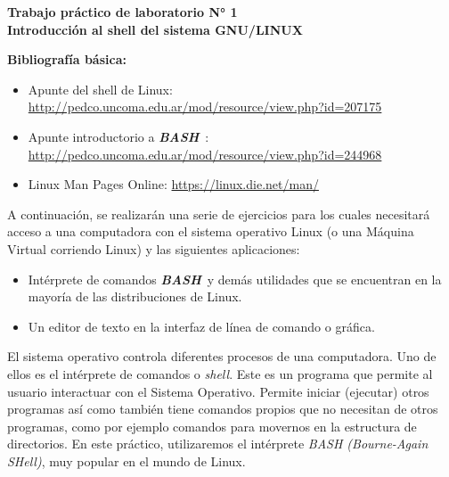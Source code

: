 \documentclass[12pt]{article}
\def\maketitle{

\makeatletter
{\color{bl} \centering \huge \sc \textbf{ Trabajo práctico de laboratorio N° 1\\ \large
\vspace*{-8pt} \color{black} Introducción al shell del sistema GNU/LINUX \vspace*{8pt} }\par}
\makeatother

\makeatletter


}
\newcommand{\bash}{\textbf{\emph{BASH}}\ }
\begin{document}
\thispagestyle{empty}
\maketitle
\setlength{\parindent}{1pt}

\textbf{Bibliografía básica:}
\vspace{-2\topsep}
\begin{itemize}

    \itemsep2pt \parskip0pt 

    \item Apunte del shell de Linux:
        \url{http://pedco.uncoma.edu.ar/mod/resource/view.php?id=207175}

    \item Apunte introductorio a \bash:
        \url{http://pedco.uncoma.edu.ar/mod/resource/view.php?id=244968}

    \item Linux Man Pages Online: \url{https://linux.die.net/man/}

\end{itemize}

A continuación, se realizarán una serie de ejercicios para los cuales
necesitará acceso a una computadora con el sistema operativo Linux (o una
Máquina Virtual corriendo Linux) y las siguientes aplicaciones:

\vspace{-2\topsep}
\begin{itemize}
    
    \itemsep2pt \parskip0pt 
        
    \item   Intérprete de comandos \bash y demás utilidades que se encuentran
        en la mayoría de las distribuciones de Linux.
        
    \item   Un editor de texto en la interfaz de línea de comando o gráfica.

\end{itemize}

El sistema operativo controla diferentes procesos de una computadora. Uno de
ellos es el intérprete de comandos o \emph{shell}. Este es un programa que
permite al usuario interactuar con el Sistema Operativo. Permite iniciar
(ejecutar) otros programas así como también tiene comandos propios que no
necesitan de otros programas, como por ejemplo comandos para movernos en la
estructura de directorios. En este práctico, utilizaremos el intérprete
\emph{BASH (Bourne-Again SHell)}, muy popular en el mundo de Linux.
\end{document}
